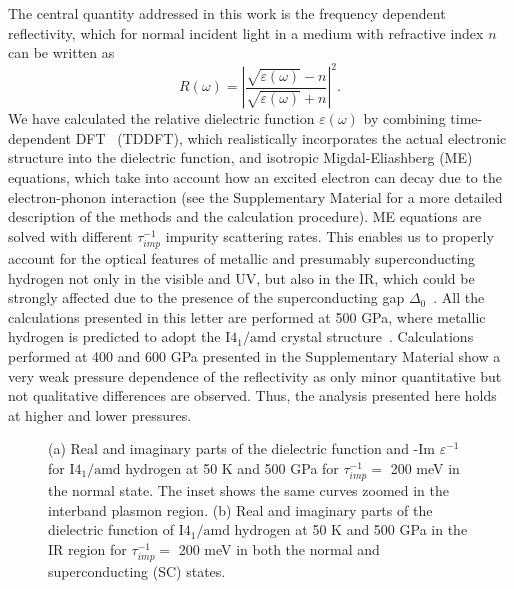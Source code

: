 \documentclass[%
 reprint,
superscriptaddress,
 amsmath,amssymb,
 aps,
prb,
floatfix,
]{revtex4-1}
\begin{document}
The central quantity addressed in this work is the frequency dependent reflectivity,
which for normal incident light in a medium with refractive index $n$ can be written as 
\begin{equation}\label{reflec}
 R(\omega)=\left|\frac{\sqrt{\varepsilon(\omega)}-n}{\sqrt{\varepsilon(\omega)}+n}\right|^2.
\end{equation}
We have calculated the relative dielectric function $\varepsilon(\omega)$ by 
combining time-dependent DFT~\cite{PhysRevLett.52.997,PhysRevLett.76.1212,PhysRevB.85.054305} (TDDFT),
which realistically incorporates the actual electronic structure
into the dielectric function, and isotropic Migdal-Eliashberg (ME) equations, 
which take into account  how
an excited electron can decay due to the electron-phonon interaction
(see the Supplementary Material for a more detailed description of the methods and the
calculation procedure). ME equations are solved with different $\tau_{imp}^{-1}$
impurity scattering rates. 
This enables us to properly account for the optical features of metallic 
and presumably superconducting hydrogen not only in the visible and UV, but also in the IR,
which could be strongly affected due to the presence of the 
superconducting gap $\Delta_0$~\cite{PhysRevLett.59.1958,Rotter1992,Capitani2017}. 
All the calculations presented in this letter are performed at 500 GPa, where metallic hydrogen 
is predicted to adopt the $\mathrm{I4_1/amd}$ 
crystal structure~\cite{PhysRevLett.112.165501,PhysRevLett.106.165302}. 
Calculations performed at 400 and 600 GPa presented in the Supplementary Material show 
a very weak pressure dependence of the reflectivity as only minor quantitative  
but not qualitative differences are observed. Thus, the analysis presented here holds
at higher and lower pressures. 

\begin{figure*}[t]
\hfill%
\caption{(a) Real and imaginary parts of the dielectric function and -Im $\varepsilon^{-1}$ for $\mathrm{I4_1/amd}$ 
hydrogen at 50 K and 500 GPa 
for $\tau_{imp}^{-1}=$ 200 meV in the normal state. 
The inset shows the same curves zoomed in the interband plasmon region.
(b) Real and imaginary parts of the dielectric function of $\mathrm{I4_1/amd}$ 
hydrogen at 50 K and 500 GPa in the IR region
for $\tau_{imp}^{-1}=$ 200 meV in both the normal and superconducting (SC) states. \label{fig2}}
\end{figure*}
 
\end{document}
